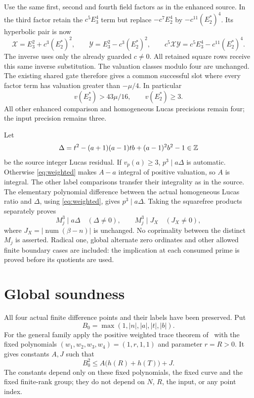 \documentclass[11pt]{article}
\theoremstyle{remark}\newtheorem{remark}[theorem]{Remark}
\begin{document}
Use the same first, second and fourth field factors as in the
enhanced source. In the third factor retain the $c^5E_3^4$ term
but replace $-c^7E_2^4$ by $-c^{11}(E_2^*)^4$. Its hyperbolic
pair is now
\[
 \mathcal X=E_3^2+c^3(E_2^*)^2,\qquad
 \mathcal Y=E_3^2-c^3(E_2^*)^2,
 \qquad c^5\mathcal X\mathcal Y
       =c^5E_3^4-c^{11}(E_2^*)^4.
\]
The inverse uses only the already guarded $c\ne0$. All retained
square rows receive this same inverse substitution.
The valuation classes modulo four are unchanged. The existing
shared gate therefore gives a common successful slot where every
factor term has valuation greater than $-\mu/4$. In particular
\[
                    v(E_2^*)>43\mu/16,\qquad v(E_2^*)\ge3.
\]
All other enhanced comparison and homogeneous Lucas precisions
remain four; the input precision remains three.

Let
\[
 \Delta=t^2-(a+1)(a-1)tb+(a-1)^2b^2-1\in\mathbb Z
\]
be the source integer Lucas residual. If $v_p(a)\ge3$,
$p^3\mid a\Delta$ is automatic. Otherwise
\eqref{eq:weighted} makes $A-a$ integral of positive valuation,
so $A$ is integral. The other label comparisons transfer their
integrality as in the source. The elementary polynomial difference
between the actual homogeneous Lucas ratio and $\Delta$, using
\eqref{eq:weighted}, gives $p^3\mid a\Delta$. Taking the
squarefree products separately proves
\begin{equation}\label{eq:radicals}
 M_j^3\mid a\Delta\quad(\Delta\ne0),\qquad
 M_j^3\mid J_X\quad(J_X\ne0),
\end{equation}
where $J_X=|\operatorname{num}(\beta-n)|$ is unchanged.
No coprimality between the distinct $M_j$ is asserted. Radical
one, global alternate zero ordinates and other allowed finite
boundary cases are included: the implication at each consumed
prime is proved before its quotients are used.

\section{Global soundness}
All four actual finite difference points and their labels have
been preserved. Put
\[
 B_0=\max(1,|n|,|a|,|t|,|b|).
\]
For the general family apply the positive weighted trace theorem
of~\cite[Theorem 1.1]{Weighted} with the fixed polynomials
$(w_1,w_2,w_3,w_4)=(1,r,1,1)$ and parameter $r=R>0$.
It gives constants $A,J$ such that
\begin{equation}\label{eq:weightedheight}
                  B_0^2\le A\bigl(h(R)+h(T)\bigr)+J.
\end{equation}
The constants depend only on these fixed polynomials, the fixed
curve and the fixed finite-rank group; they do not depend on $N$,
$R$, the input, or any point index.
\end{document}
